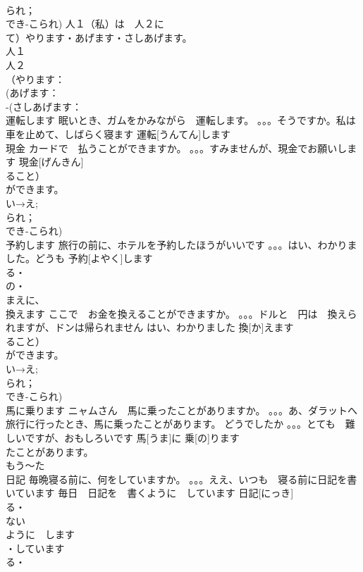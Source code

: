 \documentclass[8pt]{extreport}
\begin{document}
\begin{CJK}{UTF8}{min}
\\	られ；
\\	でき-こられ) 人１（私）は　人２に　
\\	て）やります・あげます・さしあげます。
\\	人１
\\	人２
\\	（やります：
\\	(あげます：
\\	-(さしあげます：
\\	運転します	眠いとき、ガムをかみながら　運転します。 。。。そうですか。私は　車を止めて、しばらく寝ます	運転[うんてん]します			
\\	現金	カードで　払うことができますか。 。。。すみませんが、現金でお願いします	現金[げんきん]			
\\	ること）　
\\	ができます。
\\	い→え;
\\	られ；
\\	でき-こられ)	
\\	予約します	旅行の前に、ホテルを予約したほうがいいです 。。。はい、わかりました。どうも	予約[よやく]します				
\\	る・
\\	の・
\\	まえに、
\\	換えます	ここで　お金を換えることができますか。 。。。ドルと　円は　換えられますが、ドンは帰られません はい、わかりました	換[か]えます			
\\	ること）　
\\	ができます。
\\	い→え;
\\	られ；
\\	でき-こられ)
\\	馬に乗ります	ニャムさん　馬に乗ったことがありますか。 。。。あ、ダラットへ旅行に行ったとき、馬に乗ったことがあります。 どうでしたか 。。。とても　難しいですが、おもしろいです	馬[うま]に 乗[の]ります			
\\	たことがあります。
\\	もう～た
\\	日記	毎晩寝る前に、何をしていますか。 。。。ええ、いつも　寝る前に日記を書いています 毎日　日記を　書くように　しています	日記[にっき]				
\\	る・
\\	ない
\\	ように　します
\\	・しています
\\	る・

\end{CJK}
\end{document}
